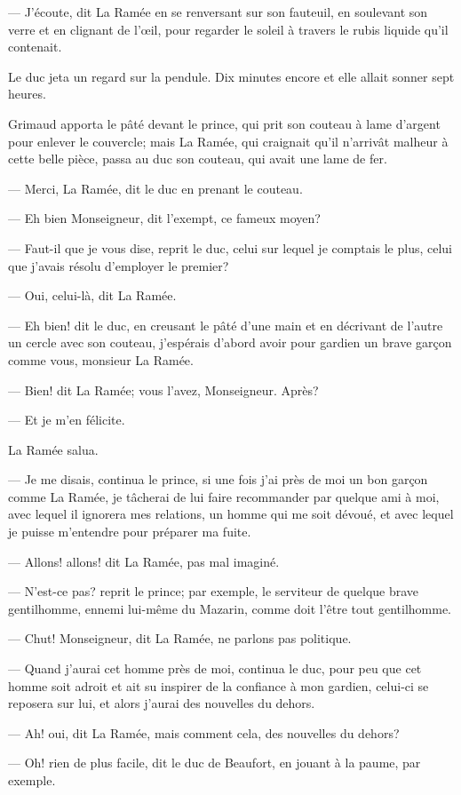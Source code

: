 — J'écoute, dit La Ramée en se renversant sur son fauteuil, en soulevant son verre et en clignant de l'œil, pour regarder le soleil à travers le rubis liquide qu'il contenait.

Le duc jeta un regard sur la pendule. Dix minutes encore et elle allait sonner sept heures.

Grimaud apporta le pâté devant le prince, qui prit son couteau à lame d'argent pour enlever le couvercle; mais La Ramée, qui craignait qu'il n'arrivât malheur à cette belle pièce, passa au duc son couteau, qui avait une lame de fer.

— Merci, La Ramée, dit le duc en prenant le couteau.

— Eh bien Monseigneur, dit l'exempt, ce fameux moyen?

— Faut-il que je vous dise, reprit le duc, celui sur lequel je comptais le plus, celui que j'avais résolu d'employer le premier?

— Oui, celui-là, dit La Ramée.

— Eh bien! dit le duc, en creusant le pâté d'une main et en décrivant de l'autre un cercle avec son couteau, j'espérais d'abord avoir pour gardien un brave garçon comme vous, monsieur La Ramée.

— Bien! dit La Ramée; vous l'avez, Monseigneur. Après?

— Et je m'en félicite.

La Ramée salua.

— Je me disais, continua le prince, si une fois j'ai près de moi un bon garçon comme La Ramée, je tâcherai de lui faire recommander par quelque ami à moi, avec lequel il ignorera mes relations, un homme qui me soit dévoué, et avec lequel je puisse m'entendre pour préparer ma fuite.

— Allons! allons! dit La Ramée, pas mal imaginé.

— N'est-ce pas? reprit le prince; par exemple, le serviteur de quelque brave gentilhomme, ennemi lui-même du Mazarin, comme doit l'être tout gentilhomme.

— Chut! Monseigneur, dit La Ramée, ne parlons pas politique.

— Quand j'aurai cet homme près de moi, continua le duc, pour peu que cet homme soit adroit et ait su inspirer de la confiance à mon gardien, celui-ci se reposera sur lui, et alors j'aurai des nouvelles du dehors.

— Ah! oui, dit La Ramée, mais comment cela, des nouvelles du dehors?

— Oh! rien de plus facile, dit le duc de Beaufort, en jouant à la paume, par exemple.

